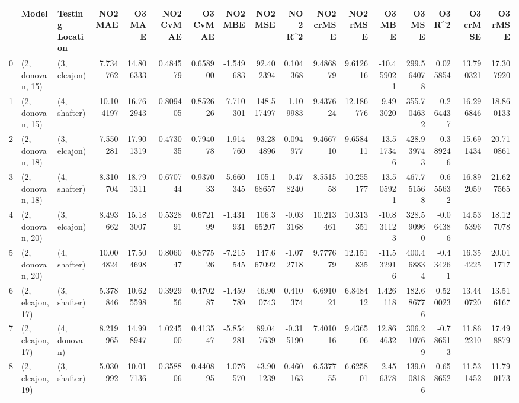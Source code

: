 \begin{tabular}{lllrrrrrrrrrrrrrr}
\toprule
{} &             Model & Testing Location &    NO2 MAE &     O3 MAE &  NO2 CvMAE &  O3 CvMAE &   NO2 MBE &      NO2 MSE &    NO2 R\textasciicircum2 &  NO2 crMSE &   NO2 rMSE &     O3 MBE &      O3 MSE &    O3 R\textasciicircum2 &   O3 crMSE &    O3 rMSE \\
\midrule
0  &  (2, donovan, 15) &     (3, elcajon) &   7.734762 &  14.806333 &   0.484579 &  0.658900 & -1.549683 &    92.402394 &   0.104368 &   9.486879 &   9.612616 & -10.459021 &  299.564078 &  0.025854 &  13.790321 &  17.307920 \\
1  &  (2, donovan, 15) &     (4, shafter) &  10.104197 &  16.762943 &   0.809405 &  0.852626 & -7.710301 &   148.517497 &  -1.109983 &   9.437624 &  12.186776 &  -9.493020 &  355.704632 & -0.264437 &  16.296846 &  18.860133 \\
2  &  (2, donovan, 18) &     (3, elcajon) &   7.550281 &  17.901319 &   0.473035 &  0.794078 & -1.914760 &    93.284896 &   0.094977 &   9.466710 &   9.658411 & -13.517346 &  428.939743 & -0.389246 &  15.691434 &  20.710861 \\
3  &  (2, donovan, 18) &     (4, shafter) &   8.310704 &  18.791311 &   0.670744 &  0.937033 & -5.660345 &   105.168657 &  -0.478240 &   8.551558 &  10.255177 & -13.505921 &  467.751568 & -0.655632 &  16.892059 &  21.627565 \\
4  &  (2, donovan, 20) &     (3, elcajon) &   8.493662 &  15.183007 &   0.532891 &  0.672199 & -1.431931 &   106.365207 &  -0.033168 &  10.213461 &  10.313351 & -10.831123 &  328.590960 & -0.064386 &  14.535396 &  18.127078 \\
5  &  (2, donovan, 20) &     (4, shafter) &  10.004824 &  17.504698 &   0.806047 &  0.877526 & -7.215545 &   147.667092 &  -1.072718 &   9.777679 &  12.151835 & -11.532916 &  400.468834 & -0.434261 &  16.354225 &  20.011717 \\
6  &  (2, elcajon, 17) &     (3, shafter) &   5.378846 &  10.625598 &   0.392956 &  0.470287 & -1.459789 &    46.900743 &   0.410374 &   6.691021 &   6.848412 &   1.426118 &  182.686776 &  0.520023 &  13.440720 &  13.516167 \\
7  &  (2, elcajon, 17) &     (4, donovan) &   8.219965 &  14.998947 &   1.024500 &  0.413547 & -5.854281 &    89.047639 &  -0.315190 &   7.401016 &   9.436506 &  12.864632 &  306.210769 & -0.786513 &  11.862210 &  17.498879 \\
8  &  (2, elcajon, 19) &     (3, shafter) &   5.030992 &  10.017136 &   0.358806 &  0.440895 & -1.076570 &    43.901239 &   0.460163 &   6.537755 &   6.625801 &  -2.456378 &  139.008186 &  0.658652 &  11.531452 &  11.790173 \\

\end{tabular}
